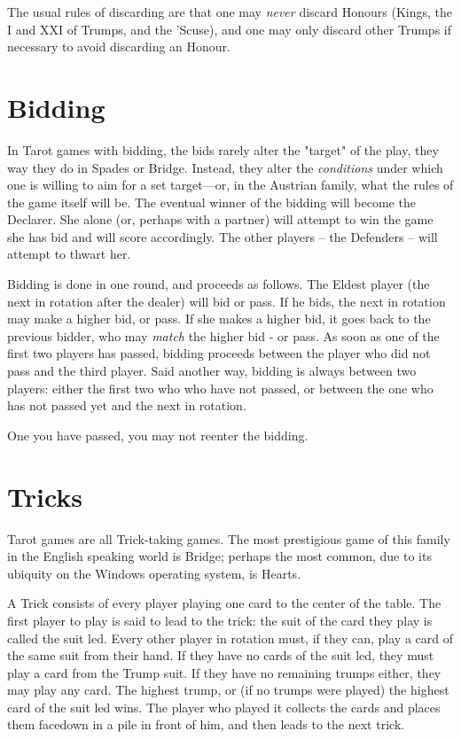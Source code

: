 \documentclass[ebook,12pt,twoside,openright,extrafontsizes,final]{memoir}
\begin{document}
The usual rules of discarding are that one may \emph{never} discard Honours (Kings, the I and 
XXI of Trumps, and the ’Scuse), and one may only discard other Trumps if necessary to avoid 
discarding an Honour. 

\section{Bidding}
In Tarot games with bidding, the bids rarely alter the "target" of the play, they way 
they do in Spades or Bridge.  Instead, they alter the \emph{conditions} under which one is
willing to aim for a set target—or, in the Austrian family, what the rules of the game
itself will be.  The eventual winner of the bidding will become the Declarer. She alone
(or, perhaps with a partner) will attempt to win the game she has bid and will score
accordingly.  The other players – the Defenders – will attempt to thwart her.

Bidding is done in one round, and proceeds as follows. The Eldest player (the next in
rotation after the dealer) will bid or pass.  If he bids, the next in rotation may make a
higher bid, or pass.  If she makes a higher bid, it goes back to the previous bidder, 
who may \emph{match} the higher bid - or pass. As soon as one of the first two players has
passed, bidding proceeds between the player who did not pass and the third player.  Said 
another way, bidding is always between two players: either the first two who who have not
passed, or between the one who has not passed yet and the next in rotation. 

One you have passed, you may not reenter the bidding.


\section{Tricks}
Tarot games are all Trick-taking games. The most prestigious game of this family
in the English speaking world is Bridge; perhaps the most common, due
to its ubiquity on the Windows operating system, is Hearts.

A Trick consists of every player playing one card to the center of the table. 
The first player to play is said to lead to the trick: the suit of the card
they play is called the suit led.  Every other player in rotation must, if
they can, play a card of the same suit from their hand.  If they have no cards
of the suit led, they must play a card from the Trump suit.  If they have no 
remaining trumps either, they may play any card.  The highest trump, or (if 
no trumps were played) the highest card of the suit led wins. The player who
played it collects the cards and places them facedown in a pile in front of
him, and then leads to the next trick.
\end{document}
